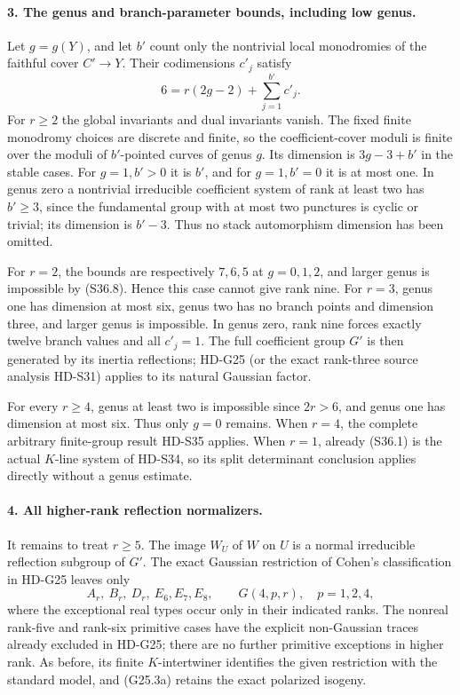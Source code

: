 \paragraph{3. The genus and branch-parameter bounds, including low genus.}
Let \(g=g(Y)\), and let \(b'\) count only the nontrivial local
monodromies of the faithful cover \(C'\to Y\). Their codimensions
\(c'_j\) satisfy
\[
                   6=r(2g-2)+\sum_{j=1}^{b'}c'_j.            \tag{S36.8}
\]
For \(r\ge2\) the global invariants and dual invariants vanish.
The fixed finite monodromy choices are discrete and finite, so the
coefficient-cover moduli is finite over the moduli of \(b'\)-pointed
curves of genus \(g\). Its dimension is \(3g-3+b'\) in the stable
cases. For \(g=1,b'>0\) it is \(b'\), and for \(g=1,b'=0\)
it is at most one. In genus zero a nontrivial irreducible coefficient
system of rank at least two has \(b'\ge3\), since the fundamental
group with at most two punctures is cyclic or trivial; its dimension
is \(b'-3\). Thus no stack automorphism dimension has been omitted.

For \(r=2\), the bounds are respectively \(7,6,5\) at
\(g=0,1,2\), and larger genus is impossible by (S36.8).
Hence this case cannot give rank nine. For \(r=3\), genus one
has dimension at most six, genus two has no branch points and
dimension three, and larger genus is impossible. In genus zero,
rank nine forces exactly twelve branch values and all \(c'_j=1\).
The full coefficient group \(G'\) is then generated by its inertia
reflections; HD-G25 (or the exact rank-three source analysis HD-S31)
applies to its natural Gaussian factor.

For every \(r\ge4\), genus at least two is impossible since
\(2r>6\), and genus one has dimension at most six. Thus only
\(g=0\) remains. When \(r=4\), the complete arbitrary finite-group
result HD-S35 applies. When \(r=1\), already (S36.1) is the
actual \(K\)-line system of HD-S34, so its split determinant
conclusion applies directly without a genus estimate.

\paragraph{4. All higher-rank reflection normalizers.}
It remains to treat \(r\ge5\). The image \(W_U\) of \(W\) on
\(U\) is a normal irreducible reflection subgroup of \(G'\).
The exact Gaussian restriction of Cohen's classification in HD-G25
leaves only
\[
 A_r,\ B_r,\ D_r,\ E_6,E_7,E_8,
             \qquad G(4,p,r),\quad p=1,2,4,                 \tag{S36.9}
\]
where the exceptional real types occur only in their indicated
ranks. The nonreal rank-five and rank-six primitive cases have the
explicit non-Gaussian traces already excluded in HD-G25; there are
no further primitive exceptions in higher rank. As before, its
finite \(K\)-intertwiner identifies the given restriction with the
standard model, and (G25.3a) retains the exact polarized isogeny.

